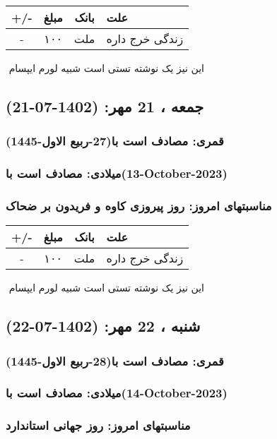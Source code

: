 \documentclass{article}
\newcommand{\rnote}[1]{\marginpar{\textcolor{color}{\StrSubstitute{\##1}{ }{\_}}}}
\newcommand{\myRow}[4]{
    #1 & #2 & #3 & #4 \\ \hline
}
\begin{document}
\begin{tabular}{ | c | c | c | p{5cm} |}
    \hline
    \myRow{ +/- }{مبلغ}{بانک}{علت}
    \myRow{-}{۱۰۰}{ملت}{زندگی خرج داره}
\end{tabular}
\newline
\newline

‌
\rnote{تست}
این نیز یک نوشته تستی است شبیه لورم ایپسام




\newpage
{}
\textcolor{color}{
\section{ جمعه ، 21 مهر: (1402-07-21) }
\subsubsection*{قمری: مصادف است با(27-ربیع الاول-1445)} 
\subsubsection*{میلادی: مصادف است با(13-October-2023)}
\subsubsection*{مناسبتهای امروز: روز پیروزی کاوه و فریدون بر ضحاک}
}


\begin{tabular}{ | c | c | c | p{5cm} |}
    \hline
    \myRow{ +/- }{مبلغ}{بانک}{علت}
    \myRow{-}{۱۰۰}{ملت}{زندگی خرج داره}
\end{tabular}
\newline
\newline

‌
\rnote{تست}
این نیز یک نوشته تستی است شبیه لورم ایپسام




\newpage
{}
\textcolor{color}{
\section{ شنبه ، 22 مهر: (1402-07-22) }
\subsubsection*{قمری: مصادف است با(28-ربیع الاول-1445)} 
\subsubsection*{میلادی: مصادف است با(14-October-2023)}
\subsubsection*{مناسبتهای امروز: روز جهانی استاندارد}
}
\end{document}

